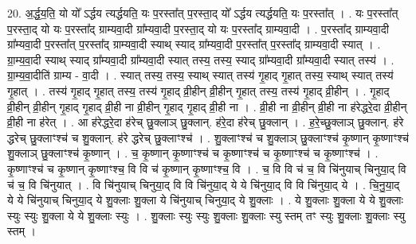 \documentclass[17pt]{extarticle}
\begin{document}
20. अ॒र्द्ध॒य॒ति॒ यो यो᳚ ऽर्द्धय त्यर्द्धयति॒ यः प॒रस्ता᳚त् प॒रस्ता॒द् यो᳚ ऽर्द्धय त्यर्द्धयति॒ यः प॒रस्ता᳚त् । . यः प॒रस्ता᳚त् प॒रस्ता॒द् यो यः प॒रस्ता᳚द् ग्राम्यवा॒दी ग्रा᳚म्यवा॒दी प॒रस्ता॒द् यो यः प॒रस्ता᳚द् ग्राम्यवा॒दी । . प॒रस्ता᳚द् ग्राम्यवा॒दी ग्रा᳚म्यवा॒दी प॒रस्ता᳚त् प॒रस्ता᳚द् ग्राम्यवा॒दी स्याथ् स्याद् ग्रा᳚म्यवा॒दी प॒रस्ता᳚त् प॒रस्ता᳚द् ग्राम्यवा॒दी स्यात् । . ग्रा॒म्य॒वा॒दी स्याथ् स्याद् ग्रा᳚म्यवा॒दी ग्रा᳚म्यवा॒दी स्यात् तस्य॒ तस्य॒ स्याद् ग्रा᳚म्यवा॒दी ग्रा᳚म्यवा॒दी स्यात् तस्य॑ । . ग्रा॒म्य॒वा॒दीति॑ ग्राम्य - वा॒दी । . स्यात् तस्य॒ तस्य॒ स्याथ् स्यात् तस्य॑ गृ॒हाद् गृ॒हात् तस्य॒ स्याथ् स्यात् तस्य॑ गृ॒हात् । . तस्य॑ गृ॒हाद् गृ॒हात् तस्य॒ तस्य॑ गृ॒हाद् व्री॒हीन् व्री॒हीन् गृ॒हात् तस्य॒ तस्य॑ गृ॒हाद् व्री॒हीन् । . गृ॒हाद् व्री॒हीन् व्री॒हीन् गृ॒हाद् गृ॒हाद् व्री॒ही ना व्री॒हीन् गृ॒हाद् गृ॒हाद् व्री॒ही ना । . व्री॒ही ना व्री॒हीन् व्री॒ही ना ह॑रेद्धरे॒दा व्री॒हीन् व्री॒ही ना ह॑रेत् । . आ ह॑रेद्धरे॒दा ह॑रेच् छु॒क्लाञ् छु॒क्लान्. ह॑रे॒दा ह॑रेच् छु॒क्लान् । . ह॒रे॒च्छु॒क्लाञ् छु॒क्लान्. ह॑रे द्धरेच् छु॒क्लाꣳश्च॑ च शु॒क्लान्. ह॑रे द्धरेच् छु॒क्लाꣳश्च॑ । . शु॒क्लाꣳश्च॑ च शु॒क्लाञ् छु॒क्लाꣳश्च॑ कृ॒ष्णान् कृ॒ष्णाꣳश्च॑ शु॒क्लाञ् छु॒क्लाꣳश्च॑ कृ॒ष्णान् । . च॒ कृ॒ष्णान् कृ॒ष्णाꣳश्च॑ च कृ॒ष्णाꣳश्च॑ च कृ॒ष्णाꣳश्च॑ च कृ॒ष्णाꣳश्च॑ । . कृ॒ष्णाꣳश्च॑ च कृ॒ष्णान् कृ॒ष्णाꣳश्च॒ वि वि च॑ कृ॒ष्णान् कृ॒ष्णाꣳश्च॒ वि । . च॒ वि वि च॑ च॒ वि चि॑नुयाच् चिनुया॒द् वि च॑ च॒ वि चि॑नुयात् । . वि चि॑नुयाच् चिनुया॒द् वि वि चि॑नुया॒द् ये ये चि॑नुया॒द् वि वि चि॑नुया॒द् ये । . चि॒नु॒या॒द् ये ये चि॑नुयाच् चिनुया॒द् ये शु॒क्लाः शु॒क्ला ये चि॑नुयाच् चिनुया॒द् ये शु॒क्लाः । . ये शु॒क्लाः शु॒क्ला ये ये शु॒क्लाः स्युः स्युः शु॒क्ला ये ये शु॒क्लाः स्युः । . शु॒क्लाः स्युः स्युः शु॒क्लाः शु॒क्लाः स्यु स्तम् तꣳ स्युः शु॒क्लाः शु॒क्लाः स्यु स्तम् । \newline
\end{document}
